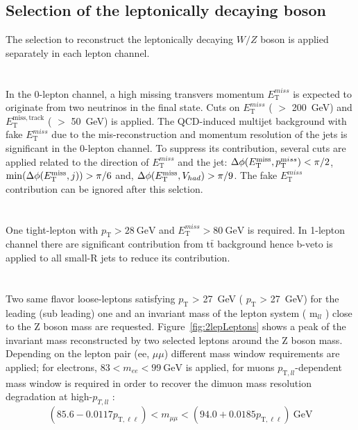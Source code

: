 \subsection{Selection of the leptonically decaying boson}
The selection to reconstruct the leptonically decaying $W/Z$ boson is applied separately in each lepton channel. \\ \\
\noindent\textbf{}  \\
In the 0-lepton channel, a high missing transvers momentum $E^{miss}_\mathrm{T}$ is expected to originate from two neutrinos in the final state. 
Cuts on $E^{miss}_\mathrm{T}$ ( $>$ 200~GeV) and $E^{\mathrm{miss,track}}_\mathrm{T}$ ( $>$ 50~GeV) is applied. 
The QCD-induced multijet background with fake $E^{miss}_\mathrm{T}$ due to the mis-reconstruction and momentum resolution of the jets is significant in the 0-lepton channel. 
To suppress its contribution, several cuts are applied related to the direction of $E^{miss}_\mathrm{T}$ and the jet: $\Delta\phi(E_\mathrm{T}^\mathrm{miss},p_{{\textrm T}}^{{\textrm miss}}) < \pi/2$, $\min(\Delta\phi(E_\mathrm{T}^\mathrm{miss},j)) > \pi/6$ and, $\Delta\phi(E_\mathrm{T}^\mathrm{miss}, V_{had}) > \pi/9$. The fake $E^{miss}_\mathrm{T}$ contribution can be ignored after this selction. \\ \\ 
\noindent\textbf{}  \\
One tight-lepton with $p_\mathrm{T} > 28~\mathrm{GeV}$ and $E^{miss}_\mathrm{T} > 80~\mathrm{GeV}$ is required. In 1-lepton channel there are significant contribution from t$\bar{\mathrm{t}}$ background hence b-veto is applied to all small-R jets to reduce its contribution.\\ \\
\noindent\textbf{}  \\
Two same flavor loose-leptons satisfying $p_\mathrm{T}$ > 27~GeV ( $p_\mathrm{T}$ > 27~GeV) for the leading (sub leading) one 
and an invariant mass of the lepton system ( m$_{ll}$ ) close to the Z boson mass are requested. Figure~\ref{fig:2lepLeptons} shows a peak of the invariant mass reconstructed by two selected leptons around the Z boson mass. Depending on the lepton pair (ee, $\mu\mu$) different mass
window requirements are applied; for electrons, $83<m_{ee}<99 ~\mathrm{GeV}$ is applied, for muons $p_{\mathrm{T},ll}$-dependent mass window is required in order to recover the dimuon mass resolution degradation at high-$p_{T,ll}$ \cite{EXOT-2016-29}:
\begin{equation*}
\left(85.6-0.0117 p_{\mathrm{T}, \ell \ell}\right)<m_{\mu \mu}<\left(94.0+0.0185 p_{\mathrm{T}, \ell \ell}\right) ~\mathrm{GeV}
\end{equation*}
